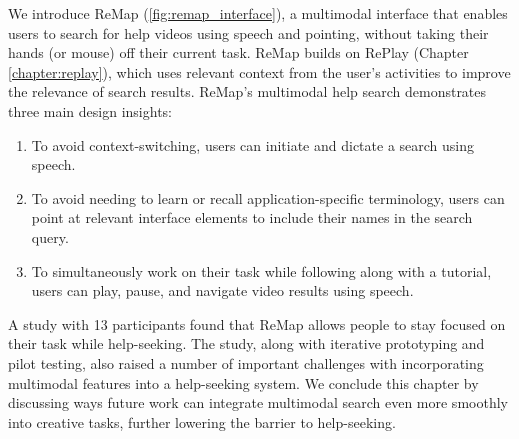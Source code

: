 We introduce ReMap (\autoref{fig:remap_interface}), a multimodal interface that enables users to search for help videos using speech and pointing, without taking their hands (or mouse) off their current task. ReMap builds on RePlay (Chapter \ref{chapter:replay}), which uses relevant context from the user's activities to improve the relevance of search results. ReMap's multimodal help search demonstrates three main design insights:
\begin{enumerate}
\item To avoid context-switching, users can initiate and dictate a search using speech.
\item To avoid needing to learn or recall application-specific terminology, users can point at relevant interface elements to include their names in the search query.
\item To simultaneously work on their task while following along with a tutorial, users can play, pause, and navigate video results using speech.
\end{enumerate}

A study with 13 participants found that ReMap allows people to stay focused on their task while help-seeking. The study, along with iterative prototyping and pilot testing, also raised a number of important challenges with incorporating multimodal features into a help-seeking system. We conclude this chapter by discussing ways future work can integrate multimodal search even more smoothly into creative tasks, further lowering the barrier to help-seeking.